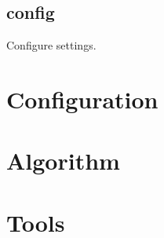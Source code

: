 \subsection{config}\label{d:subsec:config}
Configure settings.

\section{Configuration}

\section{Algorithm}

\section{Tools}

